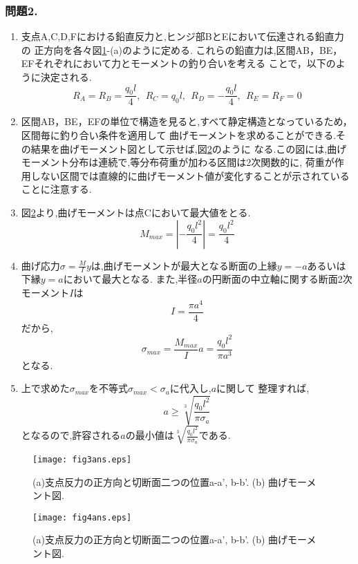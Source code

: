 ﻿\documentclass[10pt,a4j]{jarticle}
\begin{document}
\subsubsection*{問題2.}
\begin{enumerate}
\item
支点A,C,D,Fにおける鉛直反力と,ヒンジ部BとEにおいて伝達される鉛直力の
正方向を各々図\ref{fig:fig3}-(a)のように定める.
これらの鉛直力は,区間AB，BE，EFそれぞれにおいて力とモーメントの釣り合いを考える
ことで，以下のように決定される.
\begin{equation}
	R_A=R_B=\frac{q_0l}{4}, \ \ 
	R_C=q_0l, \ \ R_D=-\frac{q_0l}{4}, \ \ R_E=R_F=0
\end{equation}
\item
区間AB，BE，EFの単位で構造を見ると,すべて静定構造となっているため，区間毎に釣り合い条件を適用して
曲げモーメントを求めることができる.その結果を曲げモーメント図として示せば,図\ref{fig:fig4}のように
なる.この図には,曲げモーメント分布は連続で,等分布荷重が加わる区間は2次関数的に,
荷重が作用しない区間では直線的に曲げモーメント値が変化することが示されていることに注意する.
\item
図\ref{fig:fig4}より,曲げモーメントは点Cにおいて最大値をとる.
\begin{equation}
	M_{max}=\left|-\frac{q_0l^2}{4}\right| = \frac{q_0l^2}{4}
\end{equation}
\item
曲げ応力$\sigma=\frac{M}{I}y$は,曲げモーメントが最大となる断面の上縁$y=-a$あるいは下縁$y=a$において最大となる.
また,半径$a$の円断面の中立軸に関する断面2次モーメント$I$は
\begin{equation}
	I=\frac{\pi a^4}{4}	
\end{equation}
だから,
\begin{equation}
	\sigma_{max}=\frac{M_{max}}{I}a=\frac{q_0l^2}{\pi a^3}
\end{equation}
となる.
\item
上で求めた$\sigma_{max}$を不等式$\sigma_{max}<\sigma_a$に代入し,$a$に関して
整理すれば,
\begin{equation}
	a \geq \sqrt[3]{\frac{q_0l^2}{\pi \sigma_a}} 
\end{equation}
となるので,許容される$a$の最小値は$\sqrt[3]{\frac{q_0l^2}{\pi \sigma_a}}$である.
\end{enumerate}
\begin{figure}[h]
	\begin{center}
	\texttt{[image: fig3ans.eps]} 
	\end{center}
	\caption{
		(a)支点反力の正方向と切断面二つの位置a-a', b-b'. 
		(b) 曲げモーメント図.} 
	\label{fig:fig3}
\end{figure}
\begin{figure}[h]
	\begin{center}
	\texttt{[image: fig4ans.eps]} 
	\end{center}
	\caption{
		(a)支点反力の正方向と切断面二つの位置a-a', b-b'. 
		(b) 曲げモーメント図.} 
	\label{fig:fig4}
\end{figure}
\end{document}
